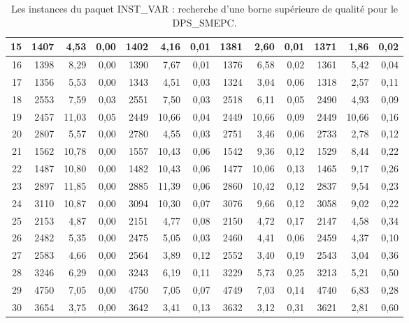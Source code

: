 \begin{table}[H]
\begin{tabular}{|r|rrr|rrr|rrr|rrr|}
15	&	1407	&	4,53	&	0,00	&	1402	&	4,16	&	0,01	&	1381	&	2,60	&	0,01	&	1371	&	1,86	&	0,02	\\ \hline
16	&	1398	&	8,29	&	0,00	&	1390	&	7,67	&	0,01	&	1376	&	6,58	&	0,02	&	1361	&	5,42	&	0,04	\\ \hline
17	&	1356	&	5,53	&	0,00	&	1343	&	4,51	&	0,03	&	1324	&	3,04	&	0,06	&	1318	&	2,57	&	0,11	\\ \hline
18	&	2553	&	7,59	&	0,03	&	2551	&	7,50	&	0,03	&	2518	&	6,11	&	0,05	&	2490	&	4,93	&	0,09	\\ \hline
19	&	2457	&	11,03	&	0,05	&	2449	&	10,66	&	0,04	&	2449	&	10,66	&	0,09	&	2449	&	10,66	&	0,16	\\ \hline
20	&	2807	&	5,57	&	0,00	&	2780	&	4,55	&	0,03	&	2751	&	3,46	&	0,06	&	2733	&	2,78	&	0,12	\\ \hline
21	&	1562	&	10,78	&	0,00	&	1557	&	10,43	&	0,06	&	1542	&	9,36	&	0,12	&	1529	&	8,44	&	0,22	\\ \hline
22	&	1487	&	10,80	&	0,00	&	1482	&	10,43	&	0,06	&	1477	&	10,06	&	0,13	&	1465	&	9,17	&	0,26	\\ \hline
23	&	2897	&	11,85	&	0,00	&	2885	&	11,39	&	0,06	&	2860	&	10,42	&	0,12	&	2837	&	9,54	&	0,23	\\ \hline
24	&	3110	&	10,87	&	0,00	&	3094	&	10,30	&	0,07	&	3076	&	9,66	&	0,12	&	3058	&	9,02	&	0,22	\\ \hline
25	&	2153	&	4,87	&	0,00	&	2151	&	4,77	&	0,08	&	2150	&	4,72	&	0,17	&	2147	&	4,58	&	0,34	\\ \hline
26	&	2482	&	5,35	&	0,00	&	2475	&	5,05	&	0,03	&	2460	&	4,41	&	0,06	&	2459	&	4,37	&	0,10	\\ \hline
27	&	2583	&	4,66	&	0,00	&	2564	&	3,89	&	0,12	&	2552	&	3,40	&	0,19	&	2543	&	3,04	&	0,36	\\ \hline
28	&	3246	&	6,29	&	0,00	&	3243	&	6,19	&	0,11	&	3229	&	5,73	&	0,25	&	3213	&	5,21	&	0,50	\\ \hline
29	&	4750	&	7,05	&	0,00	&	4750	&	7,05	&	0,07	&	4749	&	7,03	&	0,14	&	4740	&	6,83	&	0,28	\\ \hline
30	&	3654	&	3,75	&	0,00	&	3642	&	3,41	&	0,13	&	3632	&	3,12	&	0,31	&	3621	&	2,81	&	0,60	\\ \hline

		\bottomrule
	\end{tabular}%
	\caption{Les instances du paquet INST\_VAR : recherche d'une borne supérieure de qualité pour le DPS\_SMEPC.}
	\label{Comparaison_DPS-SMEPC_greedd}%
\end{table}%

